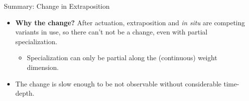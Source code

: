 \documentclass[hyperref={pdfpagelabels=false}]{beamer}
\begin{document}


\begin{frame}{Summary: Change in Extraposition}

\begin{itemize}
\item \textbf{Why the change?} After actuation, extraposition and \textsl{in situ} are competing variants in use, so there can't not be a change, even with partial specialization.
		\begin{itemize}
		\item Specialization can only be partial along the (continuous) weight dimension.
		\end{itemize}
	\item The change is slow enough to be not observable without considerable time-depth.
\end{itemize}

\end{frame}
\end{document}
